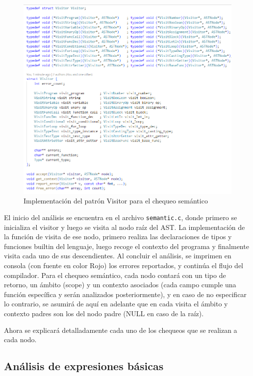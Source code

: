 \documentclass{llncs}
\begin{document}
\begin{figure}[h]
\centering
\includegraphics[width=1\textwidth]{images/visitor.png}
\caption{Implementación del patrón Visitor para el chequeo semántico}
\label{fig:visitor}
\end{figure}

El inicio del análisis se encuentra en el archivo \texttt{semantic.c}, donde primero se inicializa el visitor y luego se visita al nodo raíz del AST. La implementación de la función de
visita de ese nodo, primero realiza las declaraciones de tipos y funciones builtin del lenguaje, luego recoge el contexto del programa y finalmente visita cada uno de sus
descendientes. Al concluir el análisis, se imprimen en consola (con fuente en color Rojo) los errores reportados, y continúa el flujo del compilador. 
Para el chequeo semántico, cada nodo contará con un tipo de retorno, un ámbito (scope) y un contexto asociados (cada campo cumple una función específica y serán analizados posteriormente), y en caso de no
especificar lo contrario, se asumirá de aquí en adelante que en cada visita el ámbito y contexto padres son los del nodo padre (NULL en caso de la raíz).

Ahora se explicará detalladamente cada uno de 
los chequeos que se realizan a cada nodo.

\subsection{Análisis de expresiones básicas}
\end{document}
